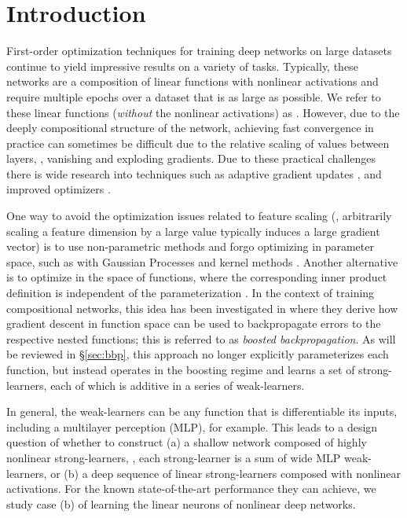 \section{Introduction}

First-order optimization techniques for training deep networks on large datasets continue
to yield impressive results on a variety of tasks. Typically, these networks are a composition
of linear functions with nonlinear activations and require multiple epochs over a dataset
that is as large as possible. We refer to these linear functions (\emph{without} the nonlinear activations)
as . However, due to the deeply compositional structure of the network,
achieving fast convergence in practice can sometimes be difficult due to the relative scaling
of values between layers, \eg, vanishing and exploding gradients.
Due to these practical challenges there is wide research into techniques
such as adaptive gradient updates \citep{kingma2014, salimans, rmsprop, momentum},
and improved optimizers \citep{amari1998, Schraudolph2002, martens2020}.

One way to avoid the optimization issues related to feature scaling
(\eg, arbitrarily scaling a feature dimension by a large value typically induces a large gradient vector)
is to use non-parametric methods and forgo optimizing in parameter space, such as with 
Gaussian Processes and kernel methods \cite{kernelbook}.
Another alternative is to optimize in the space of functions, where the corresponding inner product
definition is independent of the parameterization \citep{mason2000,friedman2001}.
In the context of training compositional networks, this idea has
been investigated in \citet{grub2010} where they derive how gradient descent in function space can be used
to backpropagate errors to the respective nested functions; this is referred to as
\emph{boosted backpropagation}.
As will be reviewed in \S \ref{sec:bbp},
this approach no longer explicitly parameterizes each function, but instead operates
in the boosting regime and learns a set of strong-learners, each of which is additive
in a series of weak-learners.

In general, the weak-learners can be any function that is differentiable \wrt
its inputs, including a multilayer perception (MLP), for example. This leads to a design question of whether
to construct (a) a shallow network composed of highly nonlinear strong-learners, 
\eg, each strong-learner is a sum of wide MLP weak-learners,
or (b) a deep sequence of linear strong-learners composed with nonlinear activations. 
For the known state-of-the-art performance they can achieve, we study case (b) of learning
the linear neurons of nonlinear deep networks.

